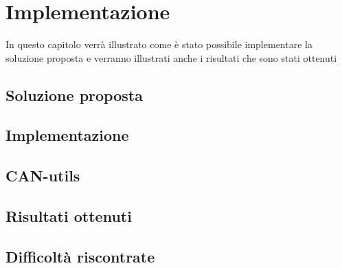 \chapter{Implementazione} %
%

\begin{citazione}
In questo capitolo verrà illustrato come è stato possibile implementare la soluzione proposta e verranno illustrati anche i risultati che sono stati ottenuti
\end{citazione}

\section{Soluzione proposta}

\section{Implementazione}

\section{CAN-utils}

\section{Risultati ottenuti}

\section{Difficoltà riscontrate}


\newpage
